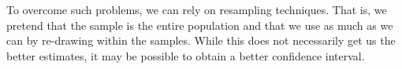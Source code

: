 \documentclass[12pt]{article}
\theoremstyle{definition}
\theoremstyle{property}
\theoremstyle{assumption}
\theoremstyle{example}
\theoremstyle{comment}
\newtheorem{comment}{Comment}[section]
\begin{document}
\begin{mdframed}[backgroundcolor=yellow!5] 
\begin{comment}[Why is $I=J$?]
To show that expressions in $I$ and $J$ are equal, I define $L(\theta;x)=f(x;\theta)$ as a likelihood function. Notice that
\[
1=\int f(x;\theta)dx
\]
Firstly, differentiate with respect to $\theta$ to get
\begin{align*}
0&=\int\frac{\partial}{\partial\theta}f(x;\theta)dx\\
&=\int\frac{\partial}{\partial\theta}\log{f(x;\theta)}\times f(x;\theta)dx = E\left[\frac{\partial \log{f(x;\theta)}}{\partial\theta}\right]
\end{align*}
Differentiate above with respect to $\theta'$ to get
\begin{align*}
0&=\int\frac{\partial}{\partial\theta'}\left(\frac{\partial}{\partial\theta}\log{f(x;\theta)}\times f(x;\theta)\right)dx \\
&=\int\frac{\partial^2}{\partial\theta\partial\theta'}\log{f(x;\theta)}dx+\int\frac{\partial\log{f(x;\theta)}}{\partial\theta}\frac{\partial f(x;\theta)}{\partial\theta'}dx \\
&=\int\frac{\partial^2}{\partial\theta\partial\theta'}\log{f(x;\theta)}dx+\int\frac{\partial\log{f(x;\theta)}}{\partial\theta}\frac{\partial \log{f(x;\theta)}}{\partial\theta'}f(x;\theta)dx\\
&=E\left[\frac{\partial^2}{\partial\theta\partial\theta'}\log{f(x;\theta)}\right]+E\left[\frac{\partial}{\partial\theta}\log{f(x;\theta)}\cdot \frac{\partial}{\partial\theta'}\log{f(x;\theta)}\right]
\end{align*}
Take the first term on RHS of the last line to LHS, and we get $I=J$. (Hogg et al. (2014))
\end{comment}
\end{mdframed} 
To overcome such problems, we can rely on resampling techniques. That is, we pretend that the sample is the entire population and that we use as much as we can by re-drawing within the samples. While this does not necessarily get us the better estimates, it may be possible to obtain a better confidence interval. 
\end{document}
